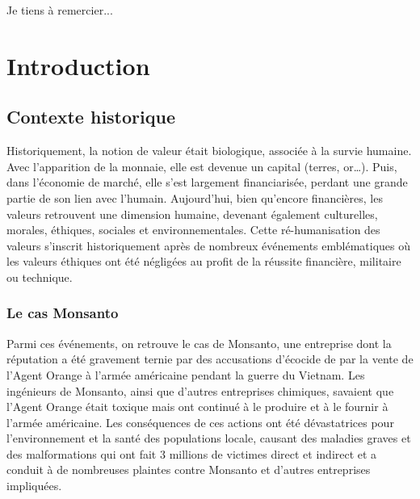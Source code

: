 \documentclass[12pt,a4paper]{report}
\begin{document}
Je tiens à remercier...

\newpage

\tableofcontents
\newpage



\printglossary[title=Glossaire]
\newpage

\chapter{Introduction}

\section*{Contexte historique}

Historiquement, la notion de valeur était biologique, associée à la survie humaine. Avec l'apparition de la monnaie, elle est devenue un capital (terres, or…). 
Puis, dans l'économie de marché, elle s'est largement financiarisée, perdant une grande partie de son lien avec l'humain.
Aujourd'hui, bien qu'encore financières, les valeurs retrouvent une dimension humaine, devenant également culturelles, morales, éthiques, sociales et environnementales. Cette ré-humanisation des valeurs s'inscrit historiquement après de nombreux événements emblématiques où les valeurs éthiques ont été négligées au profit de la réussite financière, militaire ou technique.

\subsection*{Le cas Monsanto}

Parmi ces événements, on retrouve le cas de Monsanto, une entreprise dont la réputation a été gravement ternie par des accusations d'écocide de par la vente de l'Agent Orange à l'armée américaine pendant la guerre du Vietnam.
Les ingénieurs de Monsanto, ainsi que d'autres entreprises chimiques, savaient que l'Agent Orange était toxique mais ont continué à le produire et à le fournir à l'armée américaine.
Les conséquences de ces actions ont été dévastatrices pour l'environnement et la santé des populations locale, causant des maladies graves et des malformations qui ont fait 3 millions de victimes direct et indirect et a conduit à de nombreuses plaintes contre Monsanto et d'autres entreprises impliquées.
\end{document}
